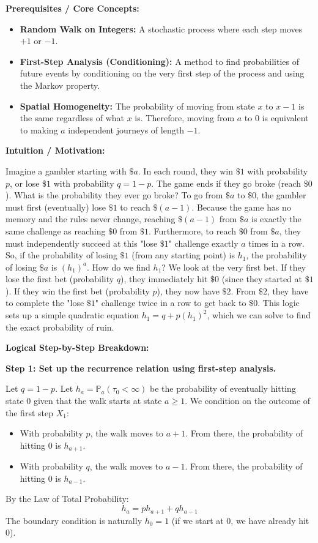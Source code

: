 \begin{solution}
\textbf{Prerequisites / Core Concepts:}
\begin{itemize}
    \item \textbf{Random Walk on Integers:} A stochastic process where each step moves $+1$ or $-1$.
    \item \textbf{First-Step Analysis (Conditioning):} A method to find probabilities of future events by conditioning on the very first step of the process and using the Markov property.
    \item \textbf{Spatial Homogeneity:} The probability of moving from state $x$ to $x-1$ is the same regardless of what $x$ is. Therefore, moving from $a$ to 0 is equivalent to making $a$ independent journeys of length $-1$.
\end{itemize}

\textbf{Intuition / Motivation:}

Imagine a gambler starting with $\$a$. In each round, they win $\$1$ with probability $p$, or lose $\$1$ with probability $q = 1-p$. The game ends if they go broke (reach $\$0$). What is the probability they ever go broke?
To go from $\$a$ to $\$0$, the gambler must first (eventually) lose $\$1$ to reach $\$(a-1)$. Because the game has no memory and the rules never change, reaching $\$(a-1)$ from $\$a$ is exactly the same challenge as reaching $\$0$ from $\$1$. 
Furthermore, to reach $\$0$ from $\$a$, they must independently succeed at this "lose $\$1$" challenge exactly $a$ times in a row. So, if the probability of losing $\$1$ (from any starting point) is $h_1$, the probability of losing $\$a$ is $(h_1)^a$.
How do we find $h_1$? We look at the very first bet. If they lose the first bet (probability $q$), they immediately hit $\$0$ (since they started at $\$1$). If they win the first bet (probability $p$), they now have $\$2$. From $\$2$, they have to complete the "lose $\$1$" challenge twice in a row to get back to $\$0$. This logic sets up a simple quadratic equation $h_1 = q + p(h_1)^2$, which we can solve to find the exact probability of ruin.

\textbf{Logical Step-by-Step Breakdown:}

\textbf{Step 1: Set up the recurrence relation using first-step analysis.}

Let $q = 1-p$. Let $h_a = \mathbb{P}_a(\tau_0 < \infty)$ be the probability of eventually hitting state $0$ given that the walk starts at state $a \geq 1$.
We condition on the outcome of the first step $X_1$:
\begin{itemize}
    \item With probability $p$, the walk moves to $a+1$. From there, the probability of hitting 0 is $h_{a+1}$.
    \item With probability $q$, the walk moves to $a-1$. From there, the probability of hitting 0 is $h_{a-1}$.
\end{itemize}
By the Law of Total Probability:
\[ h_a = p h_{a+1} + q h_{a-1} \]
The boundary condition is naturally $h_0 = 1$ (if we start at 0, we have already hit 0).


\end{solution}
